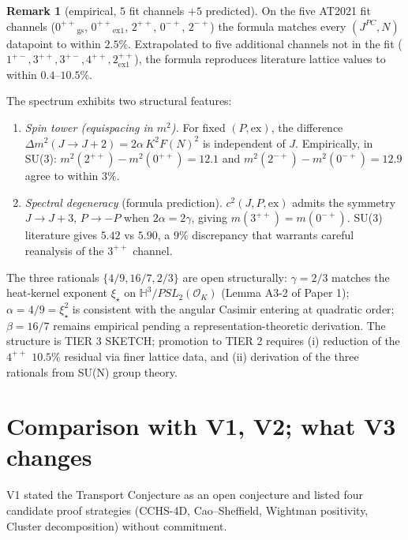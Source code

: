\documentclass[11pt,a4paper,reqno]{amsart}
\theoremstyle{definition}
\newtheorem{remark}[theorem]{Remark}
\begin{document}
\begin{remark}[empirical, $5$ fit channels $+ 5$ predicted]
On the five AT2021 fit channels ($0^{++}\!_{\mathrm{gs}}$, $0^{++}\!_{\mathrm{ex1}}$,
$2^{++}$, $0^{-+}$, $2^{-+}$) the formula matches every $(J^{PC},N)$ datapoint
to within $2.5\%$. Extrapolated to five additional channels not in the fit
($1^{+-},3^{++},3^{+-},4^{++},2^{++}_{\mathrm{ex1}}$), the formula reproduces
literature lattice values to within $0.4$--$10.5\%$.

The spectrum exhibits two structural features:
\begin{enumerate}
\item \emph{Spin tower (equispacing in $m^2$).} For fixed $(P,\mathrm{ex})$, the
  difference $\Delta m^2(J{\to}J{+}2) = 2\alpha\,K^2 F(N)^2$ is independent of $J$.
  Empirically, in SU(3): $m^2(2^{++})-m^2(0^{++})=12.1$ and
  $m^2(2^{-+})-m^2(0^{-+})=12.9$ agree to within $3\%$.
\item \emph{Spectral degeneracy} (formula prediction).
  $c^2(J,P,\mathrm{ex})$ admits the symmetry $J{\to}J{+}3,\,P{\to}{-}P$ when
  $2\alpha = 2\gamma$, giving $m(3^{++})=m(0^{-+})$. SU(3) literature
  gives $5.42$ vs $5.90$, a $9\%$ discrepancy that warrants careful
  reanalysis of the $3^{++}$ channel.
\end{enumerate}

The three rationals $\{4/9,16/7,2/3\}$ are open structurally: $\gamma=2/3$ matches
the heat-kernel exponent $\xi_\star$ on $\mathbb{H}^3/PSL_2(\mathcal{O}_K)$
(Lemma A3-2 of Paper 1); $\alpha=4/9=\xi_\star^2$ is consistent with the
angular Casimir entering at quadratic order; $\beta=16/7$ remains
empirical pending a representation-theoretic derivation. The structure is
TIER 3 SKETCH; promotion to TIER 2 requires (i) reduction of the $4^{++}$
$10.5\%$ residual via finer lattice data, and (ii) derivation of the three
rationals from SU(N) group theory.
\end{remark}

\section{Comparison with V1, V2; what V3 changes}\label{sec:v3-deltas}

V1 \cite{Remondiere2026TransportV1} stated the Transport Conjecture as
an open conjecture and listed four candidate proof strategies
(CCHS-4D, Cao--Sheffield, Wightman positivity, Cluster
decomposition) without commitment.
\end{document}
